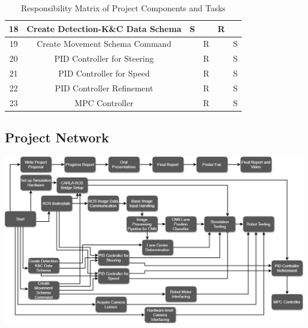 \documentclass[titlepage]{article}
\begin{document}
\begin{table}[H]
\begin{tabular}{|c | c | c | c | c | c |}
		\hline
		18   & Create Detection-K\&C Data Schema & S      &      & R   &        \\
		\hline
		19   & Create Movement Schema Command    &        & R    &     & S      \\
		\hline
		20   & PID Controller for Steering       &        & R    &     & S      \\
		\hline
		21   & PID Controller for Speed          &        & R    &     & S      \\
		\hline
		22   & PID Controller Refinement         &        & R    &     & S      \\
		\hline
		23   & MPC Controller                    &        & R    &     & S      \\
		\hline
	\end{tabular}
	\caption{Responsibility Matrix of Project Components and Tasks}
	\label{tab:WorkBreakdown}
\end{table}

\subsection{Project Network}
\includegraphics[width=10in,scale=1, angle=90, origin=c]{activity.png}
\end{document}
